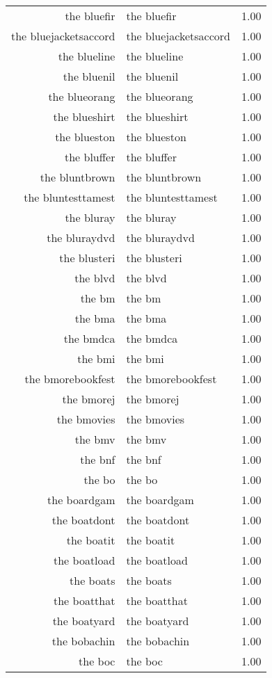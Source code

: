 \begin{table}[ht]
\begin{tabular}{rlr}
  the bluefir & the bluefir & 1.00 \\ 
  the bluejacketsaccord & the bluejacketsaccord & 1.00 \\ 
  the blueline & the blueline & 1.00 \\ 
  the bluenil & the bluenil & 1.00 \\ 
  the blueorang & the blueorang & 1.00 \\ 
  the blueshirt & the blueshirt & 1.00 \\ 
  the blueston & the blueston & 1.00 \\ 
  the bluffer & the bluffer & 1.00 \\ 
  the bluntbrown & the bluntbrown & 1.00 \\ 
  the bluntesttamest & the bluntesttamest & 1.00 \\ 
  the bluray & the bluray & 1.00 \\ 
  the bluraydvd & the bluraydvd & 1.00 \\ 
  the blusteri & the blusteri & 1.00 \\ 
  the blvd & the blvd & 1.00 \\ 
  the bm & the bm & 1.00 \\ 
  the bma & the bma & 1.00 \\ 
  the bmdca & the bmdca & 1.00 \\ 
  the bmi & the bmi & 1.00 \\ 
  the bmorebookfest & the bmorebookfest & 1.00 \\ 
  the bmorej & the bmorej & 1.00 \\ 
  the bmovies & the bmovies & 1.00 \\ 
  the bmv & the bmv & 1.00 \\ 
  the bnf & the bnf & 1.00 \\ 
  the bo & the bo & 1.00 \\ 
  the boardgam & the boardgam & 1.00 \\ 
  the boatdont & the boatdont & 1.00 \\ 
  the boatit & the boatit & 1.00 \\ 
  the boatload & the boatload & 1.00 \\ 
  the boats & the boats & 1.00 \\ 
  the boatthat & the boatthat & 1.00 \\ 
  the boatyard & the boatyard & 1.00 \\ 
  the bobachin & the bobachin & 1.00 \\ 
  the boc & the boc & 1.00 \\ 

\end{tabular}
\end{table}
